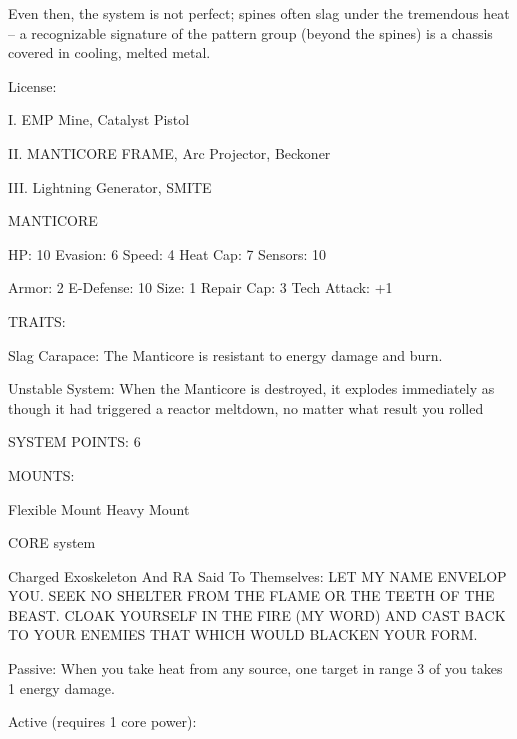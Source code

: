 Even then, the system is not perfect; spines often slag under the tremendous heat -- a recognizable  
signature of the pattern group (beyond the spines) is a chassis covered in cooling, melted metal.    

                                                    License:
 
I. EMP Mine, Catalyst Pistol
 
II. MANTICORE FRAME, Arc Projector, Beckoner
 
III. Lightning Generator, SMITE
 

                                                MANTICORE 

 HP: 10          Evasion: 6                            Speed: 4            Heat Cap: 7        Sensors: 10 

 Armor: 2        E-Defense: 10                         Size: 1             Repair Cap: 3      Tech Attack:   
                                                                                              +1 

                                                    TRAITS: 

 Slag Carapace: The Manticore is resistant to energy damage and burn.
 
 Unstable System: When the Manticore is destroyed, it explodes immediately as though it had triggered  
 a reactor meltdown, no matter what result you rolled 

                                             SYSTEM POINTS: 6 

                                                   MOUNTS: 

 Flexible Mount                                         Heavy Mount 

                                                 CORE system 

                                                                                                               


                                             Charged Exoskeleton  
 And RA Said To Themselves: LET MY NAME ENVELOP YOU. SEEK NO SHELTER FROM THE FLAME  
 OR THE TEETH OF THE BEAST. CLOAK YOURSELF IN THE FIRE (MY WORD) AND CAST BACK TO  
 YOUR ENEMIES THAT WHICH WOULD BLACKEN YOUR FORM. 
 

 Passive: When you take heat from any source, one target in range 3 of you takes 1 energy damage.
 
 Active (requires 1 core power):
 

